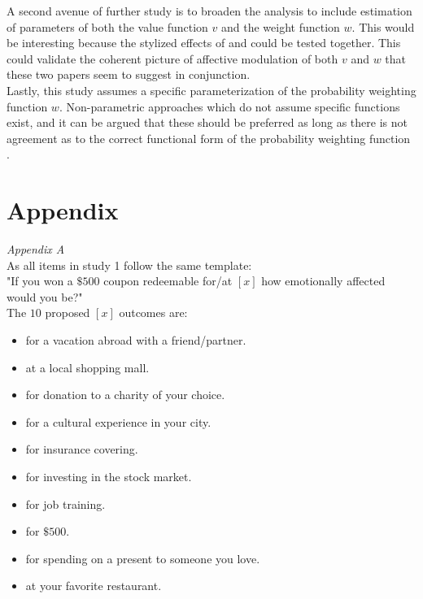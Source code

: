 \documentclass[12pt]{article}
\begin{document}
A second avenue of further study is to broaden
the analysis to include estimation of parameters
of both the value function $v$ and the weight
function  $w$. This would be interesting because
the stylized effects of \textcite{
rottenstreich2001money} and \textcite{hsee2004music}
could be tested together. This could validate
the coherent picture of affective modulation
of both $v$ and  $w$ that
these two papers seem to suggest in
conjunction. \\

Lastly, this study assumes
a specific parameterization of
the probability weighting function $w$.
Non-parametric approaches which do not assume
specific functions exist, and it can
be argued that these should be preferred
as long as there is not agreement as to
the correct functional form of the
probability weighting function
\autocite{wu1996curvature}.

\printbibliography
\section{Appendix}

\emph{Appendix A} \\
As all items in study 1 follow the same template: \\

"If you won a $\$500$ coupon redeemable for/at
$[x]$ how emotionally affected would you be?" \\

The $10$ proposed $[x]$ outcomes are:
\begin{itemize}
	\item for a vacation abroad with a friend/partner.
	\item at a local shopping mall.
	\item for donation to a charity of your choice.
	\item for a cultural experience in your city.
	\item for insurance covering.
	\item for investing in the stock market.
	\item for job training.
	\item for $\$500$.
	\item for spending on a present to someone you love.
	\item at your favorite restaurant.
\end{itemize}
\end{document}
